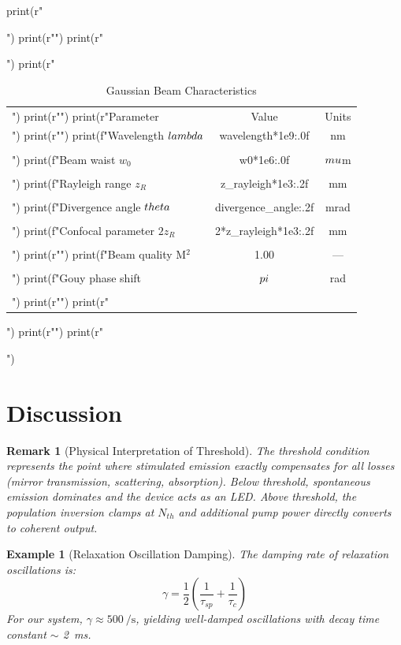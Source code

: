 \documentclass[a4paper, 11pt]{article}
\newtheorem{example}{Example}[section]
\newtheorem{remark}{Remark}[section]
\begin{document}
\begin{pycode}
print(r"\begin{table}[htbp]")
print(r"\centering")
print(r"\caption{Gaussian Beam Characteristics}")
print(r"\begin{tabular}{lcc}")
print(r"\toprule")
print(r"Parameter & Value & Units \\")
print(r"\midrule")
print(f"Wavelength $\\lambda$ & {wavelength*1e9:.0f} & nm \\\\")
print(f"Beam waist $w_0$ & {w0*1e6:.0f} & $\\mu$m \\\\")
print(f"Rayleigh range $z_R$ & {z_rayleigh*1e3:.2f} & mm \\\\")
print(f"Divergence angle $\\theta$ & {divergence_angle:.2f} & mrad \\\\")
print(f"Confocal parameter $2z_R$ & {2*z_rayleigh*1e3:.2f} & mm \\\\")
print(r"\midrule")
print(f"Beam quality M$^2$ & 1.00 & --- \\\\")
print(f"Gouy phase shift & $\\pi$ & rad \\\\")
print(r"\bottomrule")
print(r"\end{tabular}")
print(r"\label{tab:gaussian}")
print(r"\end{table}")
\end{pycode}

\section{Discussion}

\begin{remark}[Physical Interpretation of Threshold]
The threshold condition represents the point where stimulated emission exactly compensates
for all losses (mirror transmission, scattering, absorption). Below threshold, spontaneous
emission dominates and the device acts as an LED. Above threshold, the population inversion
clamps at $N_{th}$ and additional pump power directly converts to coherent output.
\end{remark}

\begin{example}[Relaxation Oscillation Damping]
The damping rate of relaxation oscillations is:
\begin{equation}
\gamma = \frac{1}{2}\left(\frac{1}{\tau_{sp}} + \frac{1}{\tau_c}\right)
\end{equation}
For our system, $\gamma \approx \SI{500}{\per\second}$, yielding well-damped oscillations
with decay time constant $\sim$ \SI{2}{\milli\second}.
\end{example}
\end{document}

